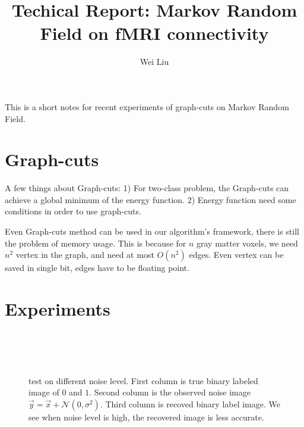 \documentclass[12pt]{article}
\begin{document}
\title{Techical Report: Markov Random Field on fMRI connectivity}
\author{Wei Liu}
\maketitle

This is a short notes for recent experiments of graph-cuts on Markov Random Field.

\section{Graph-cuts}
A few things about Graph-cuts: 1) For two-class problem, the Graph-cuts can achieve a global minimum of the energy function. 2) Energy function need some conditions in order to use graph-cuts.

Even Graph-cuts method can be used in our algorithm's framework, there is still the problem of memory usage. This is because for $n$ gray matter voxels, we need $n^2$ vertex in the graph, and need at most $O(n^2)$ edges. Even vertex can be saved in single bit, edges have to be floating point.

\section{Experiments}
\begin{figure}
\centering
{} 
 \\
 \\
 \\
\caption{test on different noise level. First column is true binary labeled image of $0$ and $1$. Second column is the observed noise image $\vec y = \vec x + \mathcal{N}(0, \sigma^2)$. Third column is recoved binary label image. We see when noise level is high, the recovered image is less accurate.}
\label{fig1}
\end{figure}
\end{document}
